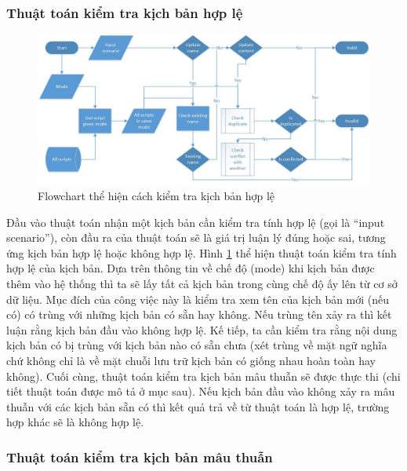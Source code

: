 \documentclass[12pt,a4paper,oneside]{extbook}
\begin{document}
\subsubsection{Thuật toán kiểm tra kịch bản hợp lệ}

\begin{figure}[h]
  \centering
     \includegraphics[width=15cm]{6-Flowchart-Scenario-Validator-Check-valid-scenario}
  \caption{Flowchart thể hiện cách kiểm tra kịch bản hợp lệ}\label{fig:6-Flowchart-Scenario-Validator-Check-valid-scenario}
\end{figure}

Đầu vào thuật toán nhận một kịch bản cần kiểm tra tính hợp lệ (gọi là “input scenario”), còn đầu ra của thuật toán sẽ là giá trị luận lý đúng hoặc sai, tương ứng kịch bản hợp lệ hoặc không hợp lệ. Hình \ref{fig:6-Flowchart-Scenario-Validator-Check-valid-scenario} thể hiện thuật toán kiểm tra tính hợp lệ của kịch bản. Dựa trên thông tin về chế độ (mode) khi kịch bản được thêm vào hệ thống thì ta sẽ lấy tất cả kịch bản trong cùng chế độ ấy lên từ cơ sở dữ liệu. Mục đích của công việc này là kiểm tra xem tên của kịch bản mới (nếu có) có trùng với những kịch bản có sẵn hay không. Nếu trùng tên xảy ra thì kết luận rằng kịch bản đầu vào không hợp lệ. Kế tiếp, ta cần kiểm tra rằng nội dung kịch bản có bị trùng với kịch bản nào có sẵn chưa (xét trùng về mặt ngữ nghĩa chứ không chỉ là về mặt chuỗi lưu trữ kịch bản có giống nhau hoàn toàn hay không). Cuối cùng, thuật toán kiểm tra kịch bản mâu thuẫn sẽ được thực thi (chi tiết thuật toán được mô tả ở mục sau). Nếu kịch bản đầu vào không xảy ra mâu thuẫn với các kịch bản sẵn có thì kết quả trả về từ thuật toán là hợp lệ, trường hợp khác sẽ là không hợp lệ.

\subsubsection{Thuật toán kiểm tra kịch bản mâu thuẫn}
\end{document}
